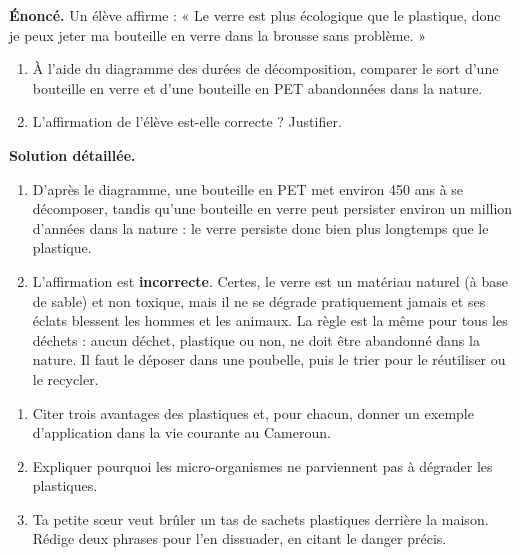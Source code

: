 \documentclass[11pt]{article}
\begin{document}
\begin{exoresolu}
\textbf{Énoncé.} Un élève affirme : « Le verre est plus écologique que le plastique, donc je peux jeter ma bouteille en verre dans la brousse sans problème. »
\begin{enumerate}
\item À l'aide du diagramme des durées de décomposition, comparer le sort d'une bouteille en verre et d'une bouteille en PET abandonnées dans la nature.
\item L'affirmation de l'élève est-elle correcte ? Justifier.
\end{enumerate}
\tcblower
\textbf{Solution détaillée.}
\begin{enumerate}
\item D'après le diagramme, une bouteille en PET met environ 450 ans à se décomposer, tandis qu'une bouteille en verre peut persister environ un million d'années dans la nature : le verre persiste donc bien plus longtemps que le plastique.
\item L'affirmation est \textbf{incorrecte}. Certes, le verre est un matériau naturel (à base de sable) et non toxique, mais il ne se dégrade pratiquement jamais et ses éclats blessent les hommes et les animaux. La règle est la même pour tous les déchets : aucun déchet, plastique ou non, ne doit être abandonné dans la nature. Il faut le déposer dans une poubelle, puis le trier pour le réutiliser ou le recycler.
\end{enumerate}
\end{exoresolu}

\begin{exercice}
\begin{enumerate}
\item Citer trois avantages des plastiques et, pour chacun, donner un exemple d'application dans la vie courante au Cameroun.
\item Expliquer pourquoi les micro-organismes ne parviennent pas à dégrader les plastiques.
\item Ta petite sœur veut brûler un tas de sachets plastiques derrière la maison. Rédige deux phrases pour l'en dissuader, en citant le danger précis.
\end{enumerate}
\end{exercice}
\end{document}
